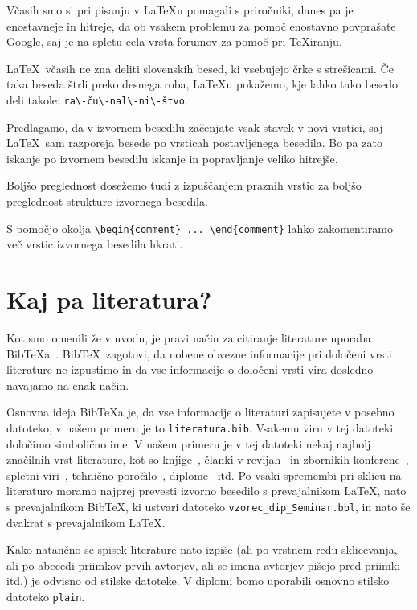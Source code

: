\documentclass[a4paper, 12pt]{book}
\newcommand{\BibTeX}{{\sc Bib}\TeX}
\begin{document}
Včasih smo si pri pisanju v \LaTeX{}u  pomagali s priročniki, danes pa je enostavneje in hitreje, da ob vsakem problemu za pomoč enostavno povprašate Google, saj je na spletu cela vrsta forumov za pomoč pri \TeX{}iranju.

\LaTeX\ včasih ne zna deliti slovenskih besed, ki vsebujejo črke s strešicami. Če taka beseda štrli preko desnega roba,  \LaTeX{}u pokažemo, kje lahko tako besedo deli takole: \verb=ra\-ču\-nal\-ni\-štvo=.

Predlagamo, da v izvornem besedilu začenjate vsak stavek v novi vrstici, saj \LaTeX\ sam razporeja besede po vrsticah postavljenega besedila. 
Bo pa zato iskanje po izvornem besedilu iskanje in popravljanje veliko hitrejše.

Boljšo preglednost dosežemo tudi z izpuščanjem praznih vrstic za boljšo preglednost strukture izvornega besedila.

S pomočjo  okolja \verb=\begin{comment} ... \end{comment}= lahko  zakomentiramo več vrstic izvornega besedila hkrati.




\chapter{Kaj pa literatura?}
\label{lit}

Kot smo omenili že v uvodu, je pravi način za citiranje literature uporaba \BibTeX{}a~\cite{bib}. 
\BibTeX\ zagotovi, da nobene obvezne informacije pri določeni vrsti literature ne izpustimo in da vse informacije o določeni vrsti vira dosledno navajamo na enak način.

Osnovna ideja \BibTeX{a} je, da vse informacije o literaturi zapisujete v posebno datoteko, v našem primeru je to \texttt{literatura.bib}.
Vsakemu viru v tej datoteki določimo simbolično ime.
V  našem primeru je v tej datoteki nekaj najbolj značilnih vrst literature, kot so knjige~\cite{lamport}, članki v revijah~\cite{leonardo} in zbornikih konferenc~\cite{poglavje_springer}, spletni viri~\cite{bib,video}, 
tehnično poročilo~\cite{andersen2012kinect}, diplome~\cite{diploma} itd.
Po vsaki spremembi pri sklicu na literaturo moramo najprej prevesti izvorno besedilo s prevajalnikom \LaTeX, nato s prevajalnikom  \BibTeX, ki ustvari datoteko  {\tt vzorec\_dip\_Seminar.bbl}, in nato še dvakrat s prevajalnikom  \LaTeX.

Kako natančno se spisek literature nato izpiše (ali po vrstnem redu sklicevanja, ali po abecedi priimkov prvih avtorjev, ali se imena avtorjev pišejo pred priimki itd.) je odvisno od stilske datoteke.
V diplomi bomo uporabili osnovno stilsko datoteko \texttt{plain}.
\end{document}
